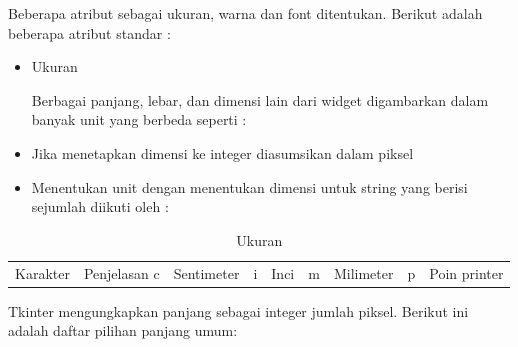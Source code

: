 

\vspace{12pt}
\hspace*{0.5in} Beberapa atribut sebagai ukuran, warna dan font ditentukan. Berikut adalah beberapa atribut standar : 
 
\begin{itemize}
\item Ukuran 
 
Berbagai panjang, lebar, dan dimensi lain dari widget digambarkan dalam banyak unit yang berbeda seperti : 
 
\item Jika menetapkan dimensi ke integer diasumsikan dalam piksel 
 
\item Menentukan unit dengan menentukan dimensi untuk string yang berisi sejumlah diikuti oleh :
\end{itemize}
\vspace{100pt}
 




\begin{table}[ht]
	\caption{Ukuran}
	\begin{tabular*}{\textwidth}{@{\extracolsep{\fill}}lcc}
		\hline
		Karakter&  Penjelasan \cr
		\hline
		c&Sentimeter&\cr
		i&Inci&\cr
		m&Milimeter&\cr
		p&Poin printer\cr
		\hline
	\end{tabular*}
	\begin{tablenotes}
	\end{tablenotes}
\end{table}




\hspace*{0.5in} Tkinter mengungkapkan panjang sebagai integer jumlah piksel. Berikut ini adalah daftar pilihan panjang umum: 
 

